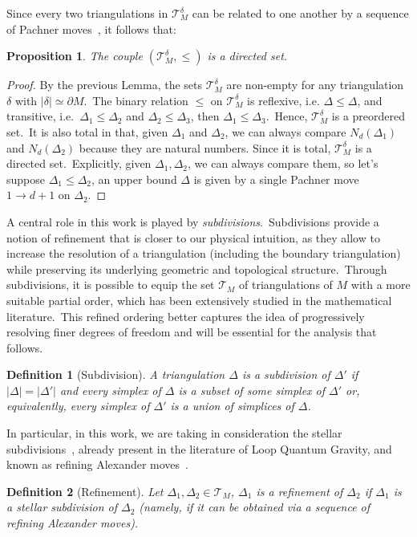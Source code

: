 \documentclass[11pt]{article}
\newcommand{\del}{\partial}
\newtheorem{proposition}{Proposition}[section]
\newtheorem{definition}{Definition}[section]
\theoremstyle{definition}
\numberwithin{equation}{section}
\begin{document}
Since every two triangulations in $\mathcal{T}_M^{\delta}$ can be related to one another by a sequence of Pachner moves~\cite{Pachner_1991,Lickorish_1999}, it follows that:
\begin{proposition}
\label{prop:w-ord}
    The couple $(\mathcal{T}_M^{\delta},\leq)$ is a directed set.
\end{proposition}
\begin{proof}
    By the previous Lemma, the sets $\mathcal{T}_M^{\delta}$ are non-empty for any triangulation $\delta$ with $|\delta|\simeq \del M$.~The binary relation $\leq$ on $\mathcal{T}_M^{\delta}$ is reflexive, i.e. $\Delta\leq \Delta$, and transitive, i.e.~$\Delta_1\leq \Delta_2$ and $\Delta_2\leq \Delta_3$, then $\Delta_1\leq \Delta_3$.~Hence, $\mathcal{T}_M^{\delta}$ is a preordered set.~It is also total in that, given $\Delta_1$ and $\Delta_2$, we can always compare $N_d(\Delta_1)$ and $N_d(\Delta_2)$ because they are natural numbers. Since it is total, $\mathcal{T}_M^{\delta}$ is a directed set.~Explicitly, given $\Delta_1, \Delta_2$, we can always compare them, so let's suppose $\Delta_1\leq \Delta_2$, an upper bound $\Delta$ is given by a single Pachner move $1\to d+1$ on $\Delta_2$.
\end{proof}
A central role in this work is played by \emph{subdivisions}.~Subdivisions provide a notion of refinement that is closer to our physical intuition, as they allow to increase the resolution of a triangulation (including the boundary triangulation) while preserving its underlying geometric and topological structure.~Through subdivisions, it is possible to equip the set $\mathcal{T}_M$ of triangulations of $M$ with a more suitable partial order, which has been extensively studied in the mathematical literature.~This refined ordering better captures the idea of progressively resolving finer degrees of freedom and will be essential for the analysis that follows.
\begin{definition}[Subdivision]
\label{def:subdiv}
    A triangulation $\Delta$ is a subdivision of $\Delta'$ if $|\Delta|=|\Delta'|$ and every simplex of $\Delta$ is a subset of some simplex of $\Delta'$ or, equivalently, every simplex of $\Delta'$ is a union of simplices of $\Delta$.
\end{definition}
In particular, in this work, we are taking in consideration the stellar subdivisions~\cite{Hudson_1969}, already present in the literature of Loop Quantum Gravity, and known as refining Alexander moves~\cite{Dittrich_Geiller_2015,Bahr_Dittrich_Geiller_2021}.
\begin{definition}[Refinement]
    Let $\Delta_1,\Delta_2\in\mathcal{T}_M$, $\Delta_1$ is a \textit{refinement} of $\Delta_2$ if $\Delta_1$ is a stellar subdivision of $\Delta_2$ (namely, if it can be obtained via a sequence of refining Alexander moves).
\end{definition}
\end{document}
